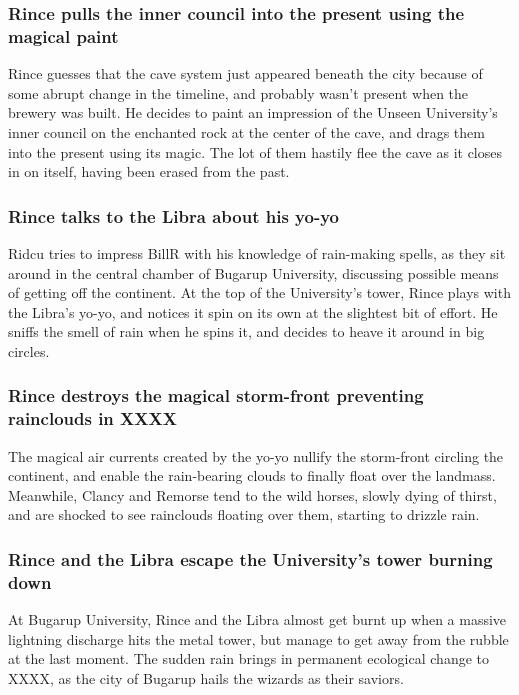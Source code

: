 \subsubsection{\Gls{Rince} pulls the inner council into the present using the magical paint}
\Gls{Rince} guesses that the cave system just appeared beneath the city because of some abrupt 
change in the timeline, and probably wasn't present when the brewery was built. He decides to paint 
an impression of the Unseen University's inner council on the enchanted rock at the center of the 
cave, and drags them into the present using its magic. The lot of them hastily flee the cave as it 
closes in on itself, having been erased from the past.

\subsubsection{\Gls{Rince} talks to the \Gls{Libra} about his yo-yo}
\Gls{Ridcu} tries to impress \Gls{BillR} with his knowledge of rain-making spells, as they sit 
around in the central chamber of Bugarup University, discussing possible means of getting off the 
continent. At the top of the University's tower, \Gls{Rince} plays with the \Gls{Libra}'s yo-yo,
and notices it spin on its own at the slightest bit of effort. He sniffs the smell of rain when he 
spins it, and decides to heave it around in big circles.

\subsubsection{\Gls{Rince} destroys the magical storm-front preventing rainclouds in XXXX}
The magical air currents created by the yo-yo nullify the storm-front circling the continent, and 
enable the rain-bearing clouds to finally float over the landmass. Meanwhile, \Gls{Clancy} and 
\Gls{Remorse} tend to the wild horses, slowly dying of thirst, and are shocked to see rainclouds 
floating over them, starting to drizzle rain.

\subsubsection{\Gls{Rince} and the \Gls{Libra} escape the University's tower burning down}
At Bugarup University, \Gls{Rince} and the \Gls{Libra} almost get burnt up when a massive lightning 
discharge hits the metal tower, but manage to get away from the rubble at the last moment. The
sudden rain brings in permanent ecological change to XXXX, as the city of Bugarup hails the wizards 
as their saviors.

